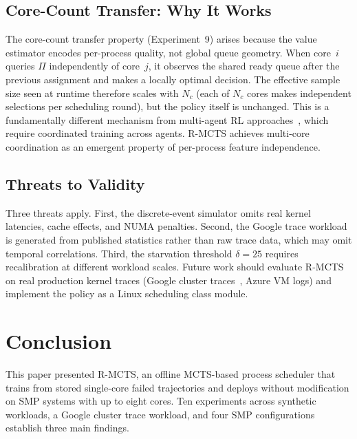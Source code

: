 \documentclass[10pt,journal,compsoc]{IEEEtran}
\begin{document}
\subsection{Core-Count Transfer: Why It Works}

The core-count transfer property (Experiment~9) arises because the
value estimator encodes per-process quality, not global queue geometry.
When core~$i$ queries $\Pi$ independently of core~$j$, it observes the
shared ready queue after the previous assignment and makes a locally
optimal decision.
The effective sample size seen at runtime therefore scales with $N_c$
(each of $N_c$ cores makes independent selections per scheduling
round), but the policy itself is unchanged.
This is a fundamentally different mechanism from multi-agent RL
approaches~\cite{mao2016}, which require coordinated training across
agents. R-MCTS achieves multi-core coordination as an emergent
property of per-process feature independence.

\subsection{Threats to Validity}

Three threats apply.
First, the discrete-event simulator omits real kernel latencies, cache
effects, and NUMA penalties.
Second, the Google trace workload is generated from published statistics
rather than raw trace data, which may omit temporal correlations.
Third, the starvation threshold $\delta{=}25$ requires recalibration
at different workload scales.
Future work should evaluate R-MCTS on real production kernel traces
(Google cluster traces~\cite{reiss2011google}, Azure VM logs) and
implement the policy as a Linux scheduling class module.

\section{Conclusion}
\label{sec:conclusion}

This paper presented R-MCTS, an offline MCTS-based process scheduler
that trains from stored single-core failed trajectories and deploys
without modification on SMP systems with up to eight cores.
Ten experiments across synthetic workloads, a Google cluster trace
workload, and four SMP configurations establish three main findings.
\end{document}
